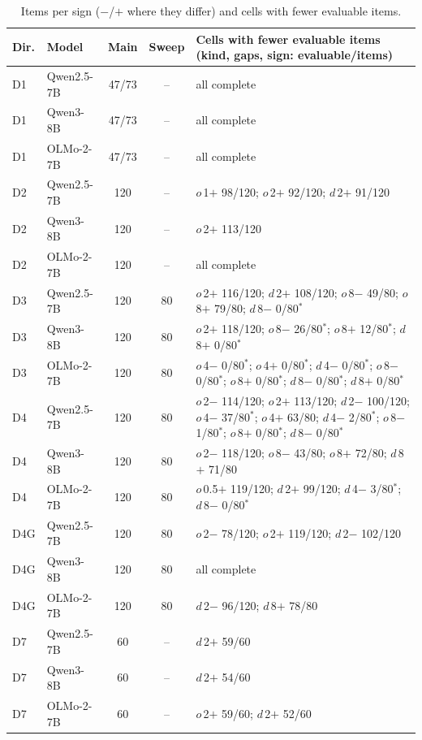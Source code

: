 \documentclass[11pt]{article}
\begin{document}
\begin{table}[H]
\centering\scriptsize
\caption{Items per sign ($-$/$+$ where they differ) and cells with fewer evaluable items.}
\label{tab:evaluable}
\begin{tabularx}{\linewidth}{@{}l l c c X@{}}
\toprule
Dir. & Model & Main & Sweep & Cells with fewer evaluable items (kind, gaps, sign: evaluable/items) \\
\midrule
D1 & Qwen2.5-7B & 47/73 & -- & all complete \\
D1 & Qwen3-8B & 47/73 & -- & all complete \\
D1 & OLMo-2-7B & 47/73 & -- & all complete \\
D2 & Qwen2.5-7B & 120 & -- & $o$\,1$+$ 98/120; $o$\,2$+$ 92/120; $d$\,2$+$ 91/120 \\
D2 & Qwen3-8B & 120 & -- & $o$\,2$+$ 113/120 \\
D2 & OLMo-2-7B & 120 & -- & all complete \\
D3 & Qwen2.5-7B & 120 & 80 & $o$\,2$+$ 116/120; $d$\,2$+$ 108/120; $o$\,8$-$ 49/80; $o$\,8$+$ 79/80; $d$\,8$-$ 0/80$^\ast$ \\
D3 & Qwen3-8B & 120 & 80 & $o$\,2$+$ 118/120; $o$\,8$-$ 26/80$^\ast$; $o$\,8$+$ 12/80$^\ast$; $d$\,8$+$ 0/80$^\ast$ \\
D3 & OLMo-2-7B & 120 & 80 & $o$\,4$-$ 0/80$^\ast$; $o$\,4$+$ 0/80$^\ast$; $d$\,4$-$ 0/80$^\ast$; $o$\,8$-$ 0/80$^\ast$; $o$\,8$+$ 0/80$^\ast$; $d$\,8$-$ 0/80$^\ast$; $d$\,8$+$ 0/80$^\ast$ \\
D4 & Qwen2.5-7B & 120 & 80 & $o$\,2$-$ 114/120; $o$\,2$+$ 113/120; $d$\,2$-$ 100/120; $o$\,4$-$ 37/80$^\ast$; $o$\,4$+$ 63/80; $d$\,4$-$ 2/80$^\ast$; $o$\,8$-$ 1/80$^\ast$; $o$\,8$+$ 0/80$^\ast$; $d$\,8$-$ 0/80$^\ast$ \\
D4 & Qwen3-8B & 120 & 80 & $o$\,2$-$ 118/120; $o$\,8$-$ 43/80; $o$\,8$+$ 72/80; $d$\,8$+$ 71/80 \\
D4 & OLMo-2-7B & 120 & 80 & $o$\,0.5$+$ 119/120; $d$\,2$+$ 99/120; $d$\,4$-$ 3/80$^\ast$; $d$\,8$-$ 0/80$^\ast$ \\
D4G & Qwen2.5-7B & 120 & 80 & $o$\,2$-$ 78/120; $o$\,2$+$ 119/120; $d$\,2$-$ 102/120 \\
D4G & Qwen3-8B & 120 & 80 & all complete \\
D4G & OLMo-2-7B & 120 & 80 & $d$\,2$-$ 96/120; $d$\,8$+$ 78/80 \\
D7 & Qwen2.5-7B & 60 & -- & $d$\,2$+$ 59/60 \\
D7 & Qwen3-8B & 60 & -- & $d$\,2$+$ 54/60 \\
D7 & OLMo-2-7B & 60 & -- & $o$\,2$+$ 59/60; $d$\,2$+$ 52/60 \\

\end{tabularx}
\end{table}
\end{document}
